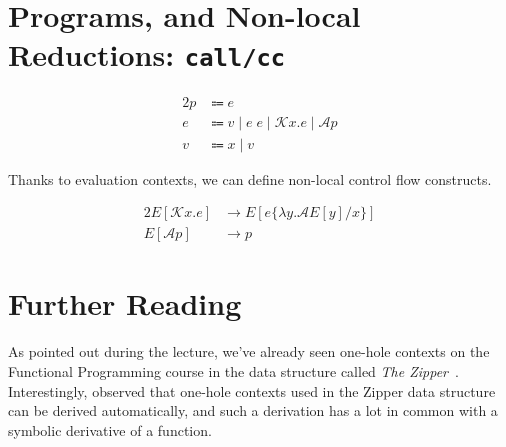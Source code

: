 \section{Programs, and Non-local Reductions: \texttt{call/cc}}

\begin{alignat*}{2}
  p & \Coloneqq e
    \tag{programs} \\
  e & \Coloneqq v \mid e\;e \mid \mathcal{K} x.e \mid \mathcal{A} p
    \tag{expressions} \\
  v & \Coloneqq x \mid v
    \tag{values}
\end{alignat*}

Thanks to evaluation contexts, we can define non-local control flow constructs.

\begin{alignat*}{2}
  E[\mathcal{K} x.e] & \longrightarrow E[e\{\lambda y.\mathcal{A} E[y] / x\}] \\
  E[\mathcal{A} p]   & \longrightarrow p
\end{alignat*}

\section{Further Reading}

As pointed out during the lecture, we've already seen one-hole contexts
on the Functional Programming course
in the data structure called \emph{The Zipper}~\citep{Huet97}.
Interestingly, \citet{McBride} observed that one-hole contexts used
in the Zipper data structure can be derived automatically,
and such a derivation has a lot in common with
a symbolic derivative of a function.
